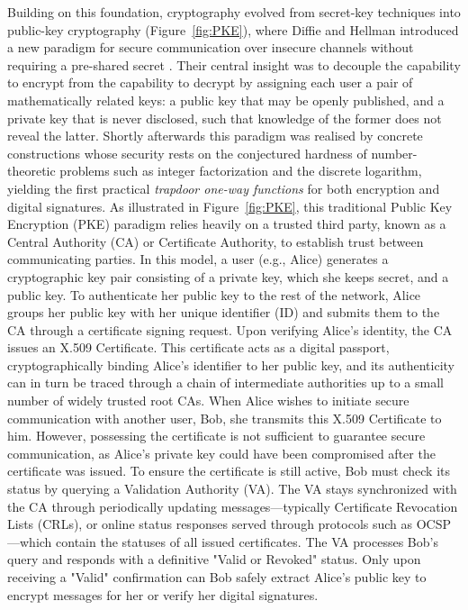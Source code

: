 Building on this foundation, cryptography evolved from secret-key techniques into public-key cryptography (Figure~\ref{fig:PKE}), where Diffie and Hellman introduced a new paradigm for secure communication over insecure channels without requiring a pre-shared secret \cite{J:DiffieHellman76}. Their central insight was to decouple the capability to encrypt from the capability to decrypt by assigning each user a pair of mathematically related keys: a public key that may be openly published, and a private key that is never disclosed, such that knowledge of the former does not reveal the latter. Shortly afterwards this paradigm was realised by concrete constructions whose security rests on the conjectured hardness of number-theoretic problems such as integer factorization and the discrete logarithm, yielding the first practical \emph{trapdoor one-way functions} for both encryption and digital signatures. As illustrated in Figure~\ref{fig:PKE}, this traditional Public Key Encryption (PKE) paradigm relies heavily on a trusted third party, known as a Central Authority (CA) or Certificate Authority, to establish trust between communicating parties. In this model, a user (e.g., Alice) generates a cryptographic key pair consisting of a private key, which she keeps secret, and a public key. To authenticate her public key to the rest of the network, Alice groups her public key with her unique identifier (ID) and submits them to the CA through a certificate signing request. Upon verifying Alice's identity, the CA issues an X.509 Certificate. This certificate acts as a digital passport, cryptographically binding Alice's identifier to her public key, and its authenticity can in turn be traced through a chain of intermediate authorities up to a small number of widely trusted root CAs. When Alice wishes to initiate secure communication with another user, Bob, she transmits this X.509 Certificate to him. However, possessing the certificate is not sufficient to guarantee secure communication, as Alice's private key could have been compromised after the certificate was issued. To ensure the certificate is still active, Bob must check its status by querying a Validation Authority (VA). The VA stays synchronized with the CA through periodically updating messages—typically Certificate Revocation Lists (CRLs), or online status responses served through protocols such as OCSP—which contain the statuses of all issued certificates. The VA processes Bob's query and responds with a definitive "Valid or Revoked" status. Only upon receiving a "Valid" confirmation can Bob safely extract Alice's public key to encrypt messages for her or verify her digital signatures.


